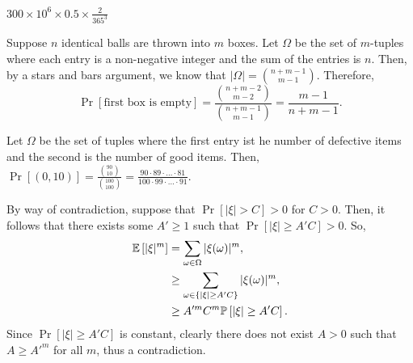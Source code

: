 \begin{problem}{1}
\end{problem}
\begin{solution} 
    $300\times {10}^{6} \times 0.5 \times \frac{2}{365^3}$
\end{solution}
\begin{problem}{2}
\end{problem}
\begin{solution}
    Suppose $n$ identical balls are thrown into $m$ boxes. Let $\Omega$ be the
    set of $m$-tuples where each entry is a non-negative integer and the sum of
    the entries is $n$. Then, by a stars and bars argument, we know that
    $|\Omega| = \binom{n+m-1}{m-1}$. Therefore, 
    \[
      \Pr\left[{\text{first box is empty}}\right] = \frac{\binom{n+m-2}{m-2}}{\binom{n+m-1}{m-1}} = \frac{m-1}{n+m-1}.
    \]
\end{solution}
\begin{problem}{3} 
\end{problem}
\begin{solution}
    Let $\Omega$ be the set of tuples where the first entry ist he number of
    defective items and the second is the number of good items. Then,
    $\Pr\left[{(0,10)}\right] = \frac{\binom{90}{10}}{\binom{100}{100}} =
    \frac{90\cdot 89 \cdot \ldots \cdot 81}{100 \cdot 99 \cdot \ldots \cdot
    91}$.
\end{solution}
\begin{problem}{4}
\end{problem}
\begin{solution}
    By way of contradiction, suppose that $\Pr\left[{|\xi| > C}\right] > 0$ for
    $C > 0$. Then, it follows that there exists some $A' \geq 1$ such that
    $\Pr\left[{|\xi| \geq A'C}\right]> 0$. So, 
    \begin{align*}
        \mathbb{E}\left[|\xi|^m\right] &= \sum_{\omega \in \Omega} |\xi(\omega)|^m, \\
        &\geq \sum_{\omega \in \left\{ |\xi| \geq A'C \right\}} |\xi(\omega)|^m, \\
        &\geq A'^mC^m\mathbb{P}\left[{|\xi| \geq A'C}\right].
    \end{align*}
    Since $\Pr\left[{|\xi| \geq A'C}\right]$ is constant, clearly there does not
    exist $A > 0$ such that $A \geq A'^m$ for all $m$, thus a contradiction.
\end{solution}
\newpage
\begin{problem}{5}
\end{problem}
